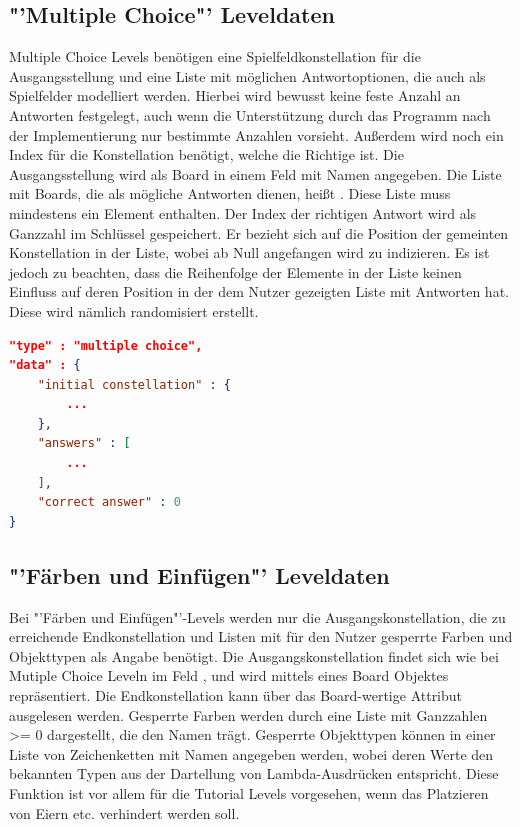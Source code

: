 \subsection{"'Multiple Choice"' Leveldaten}
Multiple Choice Levels benötigen eine Spielfeldkonstellation für die Ausgangsstellung und eine Liste mit möglichen Antwortoptionen, die auch als Spielfelder modelliert werden.
Hierbei wird bewusst keine feste Anzahl an Antworten festgelegt, auch wenn die Unterstützung durch das Programm nach der Implementierung nur bestimmte Anzahlen vorsieht.
Außerdem wird noch ein Index für die Konstellation benötigt, welche die Richtige ist.
Die Ausgangsstellung wird als Board in einem Feld mit Namen  angegeben.
Die Liste mit Boards, die als mögliche Antworten dienen, heißt .
Diese Liste muss mindestens ein Element enthalten.
Der Index der richtigen Antwort wird als Ganzzahl im Schlüssel  gespeichert.
Er bezieht sich auf die Position der gemeinten Konstellation in der  Liste, wobei ab Null angefangen wird zu indizieren.
Es ist jedoch zu beachten, dass die Reihenfolge der Elemente in der Liste keinen Einfluss auf deren Position in der dem Nutzer gezeigten Liste mit Antworten hat.
Diese wird nämlich randomisiert erstellt.

\begin{lstlisting}[language=json,caption={Grober Aufbau des data Attributs eines Multiple Choice Levels}]
"type" : "multiple choice",
"data" : {
	"initial constellation" : {
		...
	},
	"answers" : [
		...
	],
	"correct answer" : 0
}
\end{lstlisting}

\subsection{"'Färben und Einfügen"' Leveldaten}
Bei "'Färben und Einfügen"'-Levels werden nur die Ausgangskonstellation, die zu erreichende Endkonstellation und Listen mit für den Nutzer gesperrte Farben und Objekttypen als Angabe benötigt.
Die Ausgangskonstellation findet sich wie bei Mutiple Choice Leveln im Feld , und wird mittels eines Board Objektes repräsentiert.
Die Endkonstellation kann über das Board-wertige Attribut  ausgelesen werden.
Gesperrte Farben werden durch eine Liste mit Ganzzahlen >= 0 dargestellt, die den Namen  trägt.
Gesperrte Objekttypen können in einer Liste von Zeichenketten mit Namen  angegeben werden, wobei deren Werte den bekannten Typen aus der Dartellung von Lambda-Ausdrücken entspricht.
Diese Funktion ist vor allem für die Tutorial Levels vorgesehen, wenn das Platzieren von Eiern etc. verhindert werden soll.

